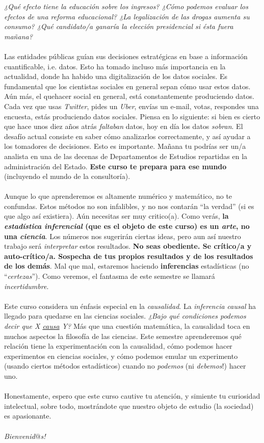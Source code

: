 \documentclass[letterpaper]{article}
\begin{document}
\emph{¿Qu\'e efecto tiene la educaci\'on sobre los ingresos? ¿C\'omo podemos evaluar los efectos de una reforma educacional? ¿La legalizaci\'on de las drogas aumenta su consumo? ¿Qu\'e candidato/a ganar\'ia la elecci\'on presidencial si \'esta fuera ma\~nana?} 
\\
\\
Las entidades p\'ublicas gu\'ian sus decisiones estrat\'egicas en base a informaci\'on cuantificable, i.e. datos. Esto ha tomado incluso m\'as importancia en la actualidad, donde ha habido una digitalizaci\'on de los datos sociales. Es fundamental que los cientistas sociales en general sepan c\'omo usar estos datos. A\'un m\'as, el quehacer social en general, est\'a constantemente produciendo datos. Cada vez que usas \emph{Twitter}, pides un \emph{Uber}, env\'ias un e-mail, votas, respondes una encuesta, est\'as produciendo datos sociales. Piensa en lo siguiente: si bien es cierto que hace unos diez a\~nos atr\'as \emph{faltaban} datos, hoy en d\'ia los datos \emph{sobran}. El desaf\'io actual consiste en saber c\'omo analizarlos correctamente, y as\'i ayudar a los tomadores de decisiones. Esto es importante. Ma\~nana tu podr\'ias ser un/a analista en una de las decenas de Departamentos de Estudios repartidas en la administraci\'on del Estado. {\bf Este curso te prepara para ese mundo} (incluyendo el mundo de la consultor\'ia).
\\
\\
Aunque lo que aprenderemos es altamente num\'erico y matem\'atico, no te confundas. Estos m\'etodos no son infalibles, y no nos contar\'an ``la verdad'' (si es que algo as\'i existiera). A\'un necesitas ser muy critico(a). Como ver\'as, {\bf la \emph{estad\'istica inferencial} (que es el objeto de este curso) es un \emph{arte}, no una \emph{ciencia}}. Los n\'umeros nos sugerir\'an ciertas ideas, pero aun as\'i nuestro trabajo ser\'a \emph{interpretar} estos resultados. {\bf No seas obediente. Se cr\'itico/a y auto-cr\'itico/a. Sospecha de tus propios resultados y de los resultados de los dem\'as}. Mal que mal, estaremos haciendo {\bf inferencias} estad\'isticas (no ``\emph{certezas}''). Como veremos, el fantasma de este semestre se llamar\'a \emph{incertidumbre}. 
\\
\\
Este curso considera un \'enfasis especial en la \emph{causalidad}. La \emph{inferencia causal} ha llegado para quedarse en las ciencias sociales. \emph{¿Bajo qu\'e condiciones podemos decir que X \underline{causa} Y?} M\'as que una cuesti\'on matem\'atica, la causalidad toca en muchos aspectos la filosof\'ia de las ciencias. Este semestre aprenderemos qu\'e relaci\'on tiene la experimentaci\'on con la causalidad, c\'omo podemos hacer experimentos en ciencias sociales, y c\'omo podemos emular un experimento (usando ciertos m\'etodos estad\'isticos) cuando no \emph{podemos} (ni \emph{debemos}!) hacer uno.
\\
\\
Honestamente, espero que este curso cautive tu atenci\'on, y simiente tu curiosidad intelectual, sobre todo, mostr\'andote que nuestro objeto de estudio (la sociedad) es apasionante. 
\\
\\
\emph{Bienvenid$@$s!}
\end{document}
